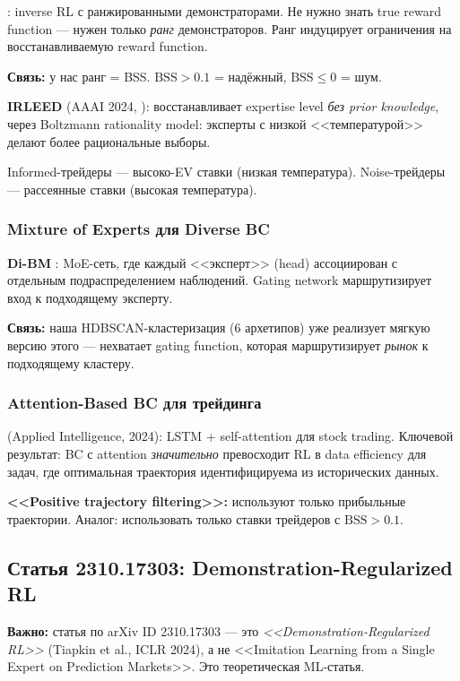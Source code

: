 \documentclass[a4paper, 11pt]{article}
\newcommand{\bss}{\mathrm{BSS}}
\begin{document}
\citet{brown2019irl}: inverse RL с ранжированными демонстраторами.
Не нужно знать true reward function --- нужен только \emph{ранг} демонстраторов.
Ранг индуцирует ограничения на восстанавливаемую reward function.

\textbf{Связь:} у нас ранг = BSS.
$\bss > 0.1$ = надёжный, $\bss \leq 0$ = шум.

\textbf{IRLEED} (AAAI 2024, \citealt{irleed2024}):
восстанавливает expertise level \emph{без prior knowledge},
через Boltzmann rationality model: эксперты с низкой <<температурой>> делают
более рациональные выборы.

Informed-трейдеры --- высоко-EV ставки (низкая температура).
Noise-трейдеры --- рассеянные ставки (высокая температура).

\subsubsection{Mixture of Experts для Diverse BC}

\textbf{Di-BM} \citep{dibm2025}: MoE-сеть, где каждый <<эксперт>> (head)
ассоциирован с отдельным подраспределением наблюдений.
Gating network маршрутизирует вход к подходящему эксперту.

\textbf{Связь:} наша HDBSCAN-кластеризация (6 архетипов)
уже реализует мягкую версию этого --- нехватает gating function,
которая маршрутизирует \emph{рынок} к подходящему кластеру.

\subsubsection{Attention-Based BC для трейдинга}

\citet{attention_bc2024} (Applied Intelligence, 2024):
LSTM + self-attention для stock trading.
Ключевой результат: BC с attention \emph{значительно} превосходит RL
в data efficiency для задач, где оптимальная траектория
идентифицируема из исторических данных.

\textbf{<<Positive trajectory filtering>>:}
используют только прибыльные траектории.
Аналог: использовать только ставки трейдеров с $\bss > 0.1$.

\subsection{Статья 2310.17303: Demonstration-Regularized RL}

\textbf{Важно:} статья по arXiv ID 2310.17303 --- это \emph{<<Demonstration-Regularized RL>>}
(Tiapkin et al., ICLR 2024), а не <<Imitation Learning from a Single Expert on Prediction Markets>>.
Это теоретическая ML-статья.
\end{document}
